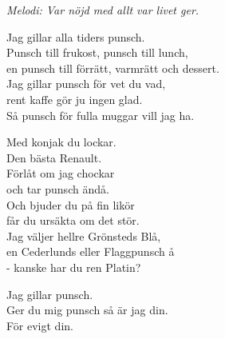 {\footnotesize\textit{Melodi: Var nöjd med allt var livet ger.}}\par
\vspace{10pt}
Jag gillar alla tiders punsch.\\
Punsch till frukost, punsch till lunch,\\
en punsch till förrätt, varmrätt och dessert.\\
Jag gillar punsch för vet du vad,\\
rent kaffe gör ju ingen glad.\\
Så punsch för fulla muggar vill jag ha.\par
\vspace{10pt}
Med konjak du lockar.\\
Den bästa Renault.\\
Förlåt om jag chockar\\
och tar punsch ändå.\\
Och bjuder du på fin likör\\
får du ursäkta om det stör.\\
Jag väljer hellre Grönsteds Blå,\\
en Cederlunds eller Flaggpunsch å\\
 - kanske har du ren Platin?\par
\vspace{10pt}
Jag gillar punsch.\\
Ger du mig punsch så är jag din.\\
För evigt din.
